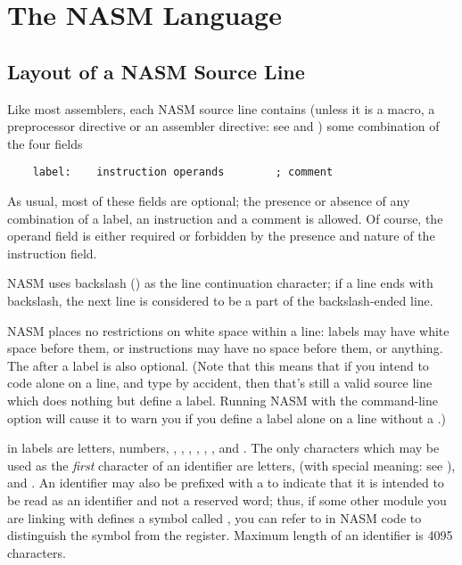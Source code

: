 \chapter{The NASM Language}
\label{ch:lang}

\section{Layout of a NASM Source Line}
\label{sec:syntax}

Like most assemblers, each NASM source line contains (unless it
is a macro, a preprocessor directive or an assembler directive: see
 and ) some combination
of the four fields

\begin{lstlisting}
	label:    instruction operands        ; comment
\end{lstlisting}

As usual, most of these fields are optional; the presence or absence
of any combination of a label, an instruction and a comment is allowed.
Of course, the operand field is either required or forbidden by the
presence and nature of the instruction field.

NASM uses backslash (\code{\\}) as the line continuation character;
if a line ends with backslash, the next line is considered to be
a part of the backslash-ended line.

NASM places no restrictions on white space within a line: labels may
have white space before them, or instructions may have no space
before them, or anything. The  after a label is also
optional. (Note that this means that if you intend to code 
alone on a line, and type  by accident, then that's still a
valid source line which does nothing but define a label. Running
NASM with the command-line option 
will cause it to warn you if you define a label alone on a line without
a .)

 in labels are letters, numbers, \code{\_},
\code{\$}, \code{\#}, \code{\@}, \code{~}, , and .
The only characters which may be used as the \emph{first} character of
an identifier are letters, \code{\.} (with special meaning: see
), \code{\_} and .
An identifier may also be prefixed with a \index{\$}
\code{\$} to indicate that it is intended to be read as an identifier
and not a reserved word; thus, if some other module you are linking with
defines a symbol called , you can refer to  in NASM
code to distinguish the symbol from the register. Maximum length of
an identifier is 4095 characters.

